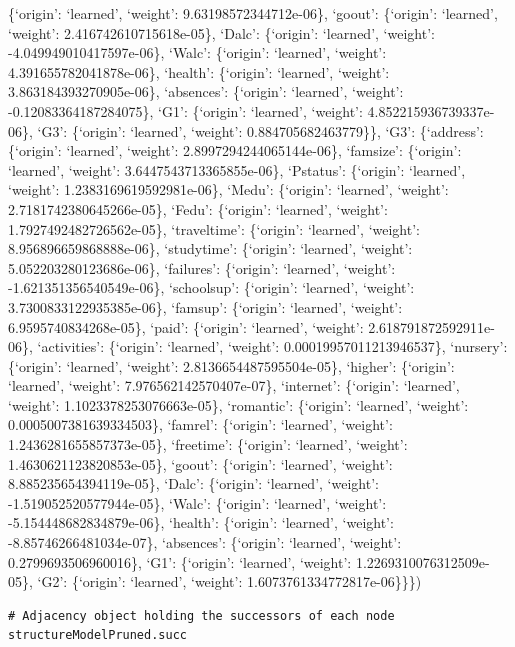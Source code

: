 \documentclass[
]{article}
\begin{document}
\{`origin': `learned', `weight': 9.63198572344712e-06\}, `goout':
\{`origin': `learned', `weight': 2.416742610715618e-05\}, `Dalc':
\{`origin': `learned', `weight': -4.049949010417597e-06\}, `Walc':
\{`origin': `learned', `weight': 4.391655782041878e-06\}, `health':
\{`origin': `learned', `weight': 3.863184393270905e-06\}, `absences':
\{`origin': `learned', `weight': -0.12083364187284075\}, `G1':
\{`origin': `learned', `weight': 4.852215936739337e-06\}, `G3':
\{`origin': `learned', `weight': 0.884705682463779\}\}, `G3':
\{`address': \{`origin': `learned', `weight': 2.8997294244065144e-06\},
`famsize': \{`origin': `learned', `weight': 3.6447543713365855e-06\},
`Pstatus': \{`origin': `learned', `weight': 1.2383169619592981e-06\},
`Medu': \{`origin': `learned', `weight': 2.7181742380645266e-05\},
`Fedu': \{`origin': `learned', `weight': 1.7927492482726562e-05\},
`traveltime': \{`origin': `learned', `weight': 8.956896659868888e-06\},
`studytime': \{`origin': `learned', `weight': 5.052203280123686e-06\},
`failures': \{`origin': `learned', `weight': -1.621351356540549e-06\},
`schoolsup': \{`origin': `learned', `weight': 3.7300833122935385e-06\},
`famsup': \{`origin': `learned', `weight': 6.9595740834268e-05\},
`paid': \{`origin': `learned', `weight': 2.618791872592911e-06\},
`activities': \{`origin': `learned', `weight': 0.00019957011213946537\},
`nursery': \{`origin': `learned', `weight': 2.8136654487595504e-05\},
`higher': \{`origin': `learned', `weight': 7.976562142570407e-07\},
`internet': \{`origin': `learned', `weight': 1.1023378253076663e-05\},
`romantic': \{`origin': `learned', `weight': 0.0005007381639334503\},
`famrel': \{`origin': `learned', `weight': 1.2436281655857373e-05\},
`freetime': \{`origin': `learned', `weight': 1.4630621123820853e-05\},
`goout': \{`origin': `learned', `weight': 8.885235654394119e-05\},
`Dalc': \{`origin': `learned', `weight': -1.519052520577944e-05\},
`Walc': \{`origin': `learned', `weight': -5.154448682834879e-06\},
`health': \{`origin': `learned', `weight': -8.85746266481034e-07\},
`absences': \{`origin': `learned', `weight': 0.2799693506960016\}, `G1':
\{`origin': `learned', `weight': 1.2269310076312509e-05\}, `G2':
\{`origin': `learned', `weight': 1.6073761334772817e-06\}\}\})

\begin{verbatim}
# Adjacency object holding the successors of each node
structureModelPruned.succ
\end{verbatim}
\end{document}
